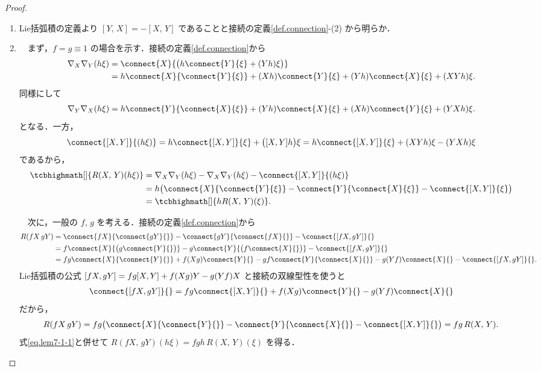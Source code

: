 \documentclass[geometry_main]{subfiles}
\begin{document}
\begin{proof} 
	\begin{enumerate} 
		\item Lie括弧積の定義より $[Y,\, X] = -[X,\, Y]$ であることと接続の定義\ref{def.connection}-(2) から明らか．
		\item 　まず，$f = g \equiv 1$ の場合を示す．接続の定義\ref{def.connection}から
		\begin{align} 
			\nabla_X \nabla_Y (h\xi) &= \connect{X}{\bigl( h \connect{Y}{\xi} + (Yh) \xi \bigr) } \\
			&= h \connect{X}{\connect{Y}{\xi}} + (Xh) \connect{Y}{\xi} + (Yh) \connect{X}{\xi} + (XYh) \xi.
		\end{align}
		同様にして
		\begin{align} 
			\nabla_Y \nabla_X (h\xi) = h \connect{Y}{\connect{X}{\xi}} + (Yh) \connect{X}{\xi} + (Xh) \connect{Y}{\xi} + (YXh) \xi.
		\end{align}
		となる．一方，
		\begin{align} 
			\connect{\comm{X}{Y}}{(h\xi)} = h \connect{\comm{X}{Y}}{\xi} + \bigl( \comm{X}{Y}h \bigr) \xi =  h \connect{\comm{X}{Y}}{\xi} + ( XYh )\xi - (YXh)\xi 
		\end{align}
		であるから，
		\begin{align} 
			\tcbhighmath[]{R(X,\, Y)(h\xi)} &= \nabla_X \nabla_Y (h\xi) - \nabla_X \nabla_Y (h\xi) -\connect{\comm{X}{Y}}{(h\xi)}  \\
			&= h \bigl( \connect{X}{\connect{Y}{\xi}} - \connect{Y}{\connect{X}{\xi}} - \connect{\comm{X}{Y}}{\xi}\bigr) \\
			&= \tcbhighmath[]{h R(X,\, Y)(\xi)}. \label{eq.lem7-1-1}
		\end{align}
		
		　次に，一般の $f,\, g$ を考える．接続の定義\ref{def.connection}から
		\begin{align} 
			R(fX\, gY) &= \connect{fX}{\connect{gY}{}} - \connect{gY}{\connect{fX}{}} - \connect{\comm{fX}{gY}}{} \\
			&= f\connect{X}{\bigl(g\connect{Y}{}\bigr)} - g\connect{Y}{\bigl(f\connect{X}{}\bigr)} - \connect{\comm{fX}{gY}}{} \\
			&= fg \connect{X}{\connect{Y}{}} + f(Xg) \connect{Y}{} - gf \connect{Y}{\connect{X}{}} - g(Yf) \connect{X}{} - \connect{\comm{fX}{gY}}{}.
		\end{align}
		Lie括弧積の公式 $\comm{fX}{gY} = fg\comm{X}{Y} + f(Xg) Y - g(Yf)X$ と接続の双線型性を使うと
		\begin{align} 
			\connect{\comm{fX}{gY}}{} = fg \connect{\comm{X}{Y}}{} + f(Xg) \connect{Y}{} - g(Yf) \connect{X}{}
		\end{align}
		だから，
		\begin{align} 
			R(fX\, gY) = fg \bigl( \connect{X}{\connect{Y}{}} - \connect{Y}{\connect{X}{}} - \connect{\comm{X}{Y}}{} \bigr) = fg\, R(X,\, Y).
		\end{align}
		式\eqref{eq.lem7-1-1}と併せて $R(fX,\, gY)(h\xi) = fgh\, R(X,\, Y)(\xi)$ を得る．
	\end{enumerate}
\end{proof}
\end{document}
